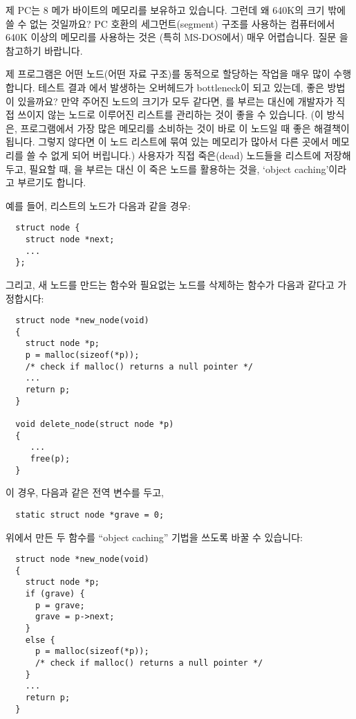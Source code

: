 \begin{faq}
	제 PC는 8 메가 바이트의 메모리를 보유하고 있습니다.
	그런데 왜 640K의 크기 밖에 쓸 수 없는 것일까요?
\A
	PC 호환의 세그먼트(segment) 구조를 사용하는 컴퓨터에서
	640K 이상의 메모리를 사용하는 것은 (특히 MS-DOS에서) 매우 어렵습니다.
	질문 을 참고하기 바랍니다.
\end{faq}

\begin{faq}
        제 프로그램은 어떤 노드(어떤 자료 구조)를 동적으로 할당하는 작업을
        매우 많이 수행합니다. 테스트 결과 에서 발생하는
        오버헤드가 bottleneck이 되고 있는데, 좋은 방법이 있을까요?
\A
        만약 주어진 노드의 크기가 모두 같다면, 를 부르는 대신에
        개발자가 직접 쓰이지 않는 노드로 이루어진 리스트를 관리하는 것이
        좋을 수 있습니다. (이 방식은, 프로그램에서 가장 많은 메모리를 
        소비하는 것이
        바로 이 노드일 때 좋은 해결책이 됩니다. 그렇지 않다면 이 노드 리스트에
        묶여 있는 메모리가 많아서 다른 곳에서 메모리를 쓸 수 없게 되어
        버립니다.)
\T
        사용자가 직접 죽은(dead) 노드들을 리스트에 저장해 두고, 필요할 때,
        을 부르는 대신 이 죽은 노드를 활용하는 것을,
        `object caching'이라고 부르기도 합니다.

        예를 들어, 리스트의 노드가 다음과 같을 경우:
\begin{verbatim}
  struct node {
    struct node *next;
    ...
  };
\end{verbatim}
	그리고, 새 노드를 만드는 함수와 필요없는 노드를 삭제하는 함수가
        다음과 같다고 가정합시다:
\begin{verbatim}
  struct node *new_node(void)
  {
    struct node *p;
    p = malloc(sizeof(*p));
    /* check if malloc() returns a null pointer */
    ...
    return p;
  }

  void delete_node(struct node *p)
  {
     ...
     free(p);
  }
\end{verbatim}
	\noindent 이 경우, 다음과 같은 전역 변수를 두고,
\begin{verbatim}
  static struct node *grave = 0;
\end{verbatim}
	\noindent 위에서 만든 두 함수를 ``object caching'' 기법을 쓰도록
        바꿀 수 있습니다:
\begin{verbatim}
  struct node *new_node(void)
  {
    struct node *p;
    if (grave) {
      p = grave;
      grave = p->next;
    }
    else {
      p = malloc(sizeof(*p));
      /* check if malloc() returns a null pointer */
    }
    ...
    return p;
  }


\end{verbatim}
\end{faq}
